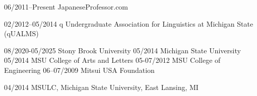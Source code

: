 \documentclass[10pt,oneside]{article}
\begin{document}

\begin{reslist}
		{06/2011--Present}
		{JapaneseProfessor.com}
		{}
	
		{02/2012--05/2014}
		{q Undergraduate Association for Linguistics at Michigan State (qUALMS)}
		{}
\end{reslist}


	
\begin{reslist}
		{08/2020-05/2025}
		{Stony Brook University}
		{}
		{05/2014}
		{Michigan State University}
		{}
		{05/2014}
		{MSU College of Arts and Letters }
		{}
		{05-07/2012}
		{MSU College of Engineering}
		{}
		{06--07/2009}
		{Mitsui USA Foundation}
		{}
\end{reslist}

\begin{reslist}
		{04/2014}
		{MSULC, Michigan State University, East Lansing, MI}
		{}
\end{reslist}



%
%	
%	
%	
%	
\end{document}
